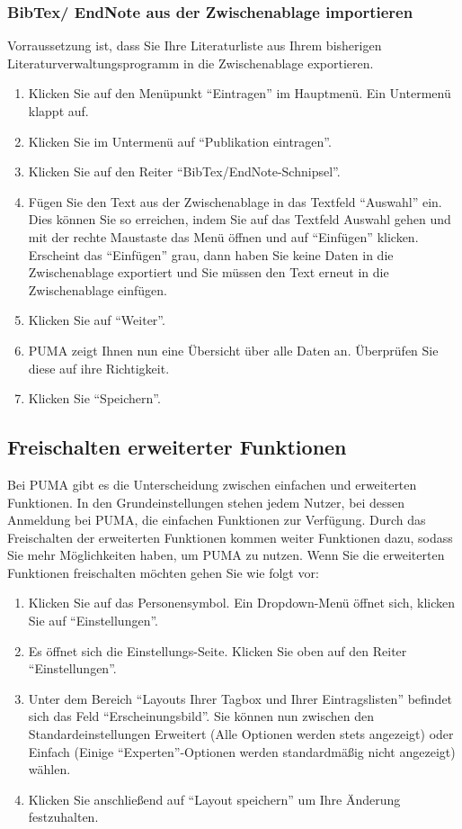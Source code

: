 \documentclass[a4paper,11pt,twoside]{scrbook}
\begin{document}
\subsubsection{BibTex/ EndNote aus der Zwischenablage importieren}
Vorraussetzung ist, dass Sie Ihre Literaturliste aus Ihrem bisherigen Literaturverwaltungsprogramm in die Zwischenablage exportieren.
\begin{enumerate}
    \item Klicken Sie auf den Menüpunkt \enquote{Eintragen} im Hauptmenü. Ein Untermenü klappt auf.
    \item Klicken Sie im Untermenü auf \enquote{Publikation eintragen}.
    \item Klicken Sie auf den Reiter \enquote{BibTex/EndNote-Schnipsel}.
    \item Fügen Sie den Text aus der Zwischenablage in das Textfeld \enquote{Auswahl} ein. Dies können Sie so erreichen, indem Sie auf das Textfeld Auswahl gehen und mit der rechte Maustaste das Menü öffnen und auf \enquote{Einfügen} klicken. Erscheint das \enquote{Einfügen} grau, dann haben Sie keine Daten in die Zwischenablage exportiert und Sie müssen den Text erneut in die Zwischenablage einfügen.
    \item Klicken Sie auf \enquote{Weiter}.
    \item PUMA zeigt Ihnen nun eine Übersicht über alle Daten an. Überprüfen Sie diese auf ihre Richtigkeit.
    \item Klicken Sie \enquote{Speichern}.
\end{enumerate}
    
\subsection{Freischalten erweiterter Funktionen}
Bei PUMA gibt es die Unterscheidung zwischen einfachen und erweiterten Funktionen. In den Grundeinstellungen stehen jedem Nutzer, bei dessen Anmeldung bei PUMA, die einfachen Funktionen zur Verfügung. Durch das Freischalten der erweiterten Funktionen kommen weiter Funktionen dazu, sodass Sie mehr Möglichkeiten haben, um PUMA zu nutzen.  Wenn Sie die erweiterten Funktionen freischalten möchten gehen Sie wie folgt vor:
\begin{enumerate}
    \item Klicken Sie auf das Personensymbol. Ein Dropdown-Menü öffnet sich, klicken Sie auf \enquote{Einstellungen}.
    \item Es öffnet sich die Einstellungs-Seite. Klicken Sie oben auf den Reiter \enquote{Einstellungen}.
    \item Unter dem Bereich \enquote{Layouts Ihrer Tagbox und Ihrer Eintragslisten} befindet sich das Feld \enquote{Erscheinungsbild}. Sie können nun zwischen den Standardeinstellungen Erweitert (Alle Optionen werden stets angezeigt) oder Einfach (Einige \enquote{Experten}-Optionen werden standardmäßig nicht angezeigt) wählen.
    \item Klicken Sie anschließend auf \enquote{Layout speichern} um Ihre Änderung festzuhalten.
\end{enumerate}
\end{document}
